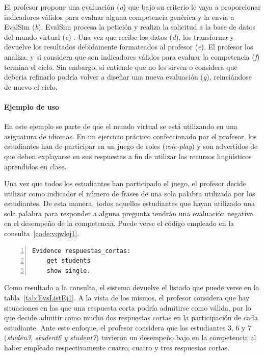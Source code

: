 El profesor propone una evaluación (\emph{a}) que bajo su criterio le vaya a proporcionar indicadores válidos para evaluar alguna competencia genérica y la envía a EvalSim (\emph{b}). EvalSim procesa la petición y realiza la solicitud a la base de datos del mundo virtual (\emph{c}) . Una vez que recibe los datos (\emph{d}), los transforma y devuelve los resultados debidamente formateados al profesor (\emph{e}). El profesor los analiza, y si considera que son indicadores válidos para evaluar la competencia (\emph{f}) termina el ciclo. Sin embargo, si entiende que no les sirven o considera que deberia refinarlo podría volver a diseñar una nueva evaluación (\emph{g}), reinciándose de nuevo el ciclo.


\paragraph*{Ejemplo de uso}

En este ejemplo se parte de que el mundo virtual se está utilizando en una asignatura de idiomas. En un ejercicio práctico confeccionado por el profesor, los estudiantes han de participar en un juego de roles (\emph{role-play}) y son advertidos de que deben explayarse en sus respuestas a fin de utilizar los recursos lingüísticos aprendidos en clase.

Una vez que todos los estudiantes han participado el juego, el profesor decide utilizar como indicador el número de frases de una sola palabra utilizada por los estudiantes. De esta manera, todos aquellos estudiantes que hayan utilizado una sola palabra para responder a alguna pregunta tendrán una evaluación negativa en el desempeño de la competencia. Puede verse el código empleado en la consulta~\ref{code:vqwlej1}.

\begin{lstlisting}[caption=Respuesas de una sola palabra, label=code:vqwlej1,numbers=left, captionpos=b, morekeywords={Evidence,get, students, single, show, words, sentences, turns, time, points}]
Evidence respuestas_cortas:
    get students
    show single.
\end{lstlisting}

Como resultado a la consulta, el sistema devuelve el listado que puede verse en la tabla~\ref{tab:EvsListEj1}. A la vista de los mismos, el profesor considera que hay situaciones en las que una respuesta corta podría admitirse como válida, por lo que decide admitir como mucho dos respuestas cortas en la participación de cada estudiante. Ante este enfoque, el profesor considera que los estudiantes 3, 6 y 7 (\emph{studen3, student6 y student7}) tuvieron un desempeño bajo en la competencia al haber empleado respectivamente cuatro, cuatro y tres respuestas cortas.

